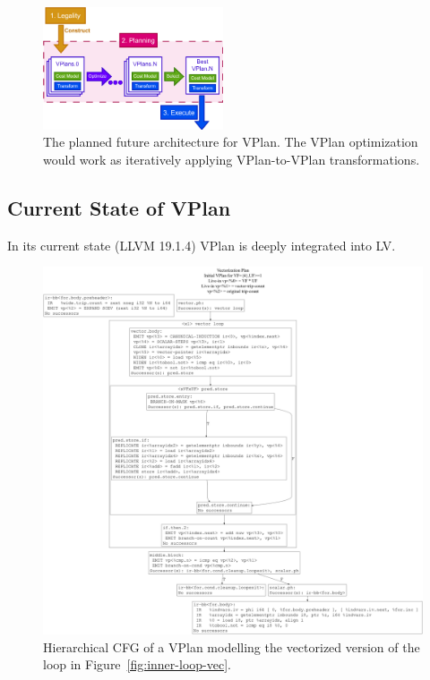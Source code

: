 \documentclass[sigplan,11pt,nonacm]{acmart}
\begin{document}
\begin{figure}
  \centering
  \includegraphics[width=0.475\textwidth]{images/vplan-future.png}
  \caption{The planned future architecture for VPlan. The VPlan optimization would
  work as iteratively applying VPlan-to-VPlan transformations.}
  \label{fig:vplan-future}
\end{figure}

\subsection{Current State of VPlan}

In its current state (LLVM 19.1.4) VPlan is deeply integrated into LV. 


\begin{figure}[ht!]
  \centering
  \includegraphics[width=\textwidth]{images/inner-loop-vplan-hcfg.png}
  \caption{Hierarchical CFG of a VPlan modelling the vectorized version of the loop in 
  Figure~\ref{fig:inner-loop-vec}.}
  \label{fig:inner-loop-vplan-hcfg}
\end{figure}
\end{document}
